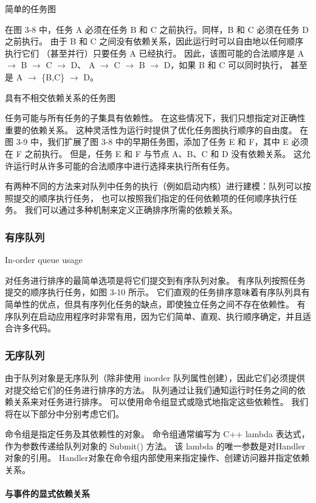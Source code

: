 {\color{red} 简单的任务图 }

在图 3-8 中，任务 A 必须在任务 B 和 C 之前执行。同样，B 和 C 必须在任务 D 之前执行。
由于 B 和 C 之间没有依赖关系，因此运行时可以自由地以任何顺序执行它们 （甚至并行）只要任务 A 已经执行。 
因此，该图可能的合法顺序是 A $\rightarrow$ B $\rightarrow$ C $\rightarrow$ D、
A $\rightarrow$ C $\rightarrow$ B $\rightarrow$ D，如果 B 和 C 可以同时执行，
甚至是 A $\rightarrow$ \{B,C\} $\rightarrow$ D。

{\color{red} 具有不相交依赖关系的任务图}

任务可能与所有任务的子集具有依赖性。 在这些情况下，我们只想指定对正确性重要的依赖关系。 
这种灵活性为运行时提供了优化任务图执行顺序的自由度。 
在图 3-9 中，我们扩展了图 3-8 中的早期任务图，添加了任务 E 和 F，其中 E 必须在 F 之前执行。
但是，任务 E 和 F 与节点 A、B、C 和 D 没有依赖关系。 这允许运行时从许多可能的合法顺序中进行选择来执行所有任务。

有两种不同的方法来对队列中任务的执行（例如启动内核）进行建模：队列可以按照提交的顺序执行任务，
也可以按照我们指定的任何依赖项的任何顺序执行任务。 我们可以通过多种机制来定义正确排序所需的依赖关系。

\subsubsection{有序队列}
{\color{red} In-order queue usage}

对任务进行排序的最简单选项是将它们提交到有序队列对象。 有序队列按照任务提交的顺序执行任务，如图 3-10 所示。 
它们直观的任务排序意味着有序队列具有简单性的优点，但具有序列化任务的缺点，即使独立任务之间不存在依赖性。 
有序队列在启动应用程序时非常有用，因为它们简单、直观、执行顺序确定，并且适合许多代码。

\subsubsection{无序队列}
由于队列对象是无序队列（除非使用 inorder 队列属性创建），因此它们必须提供对提交给它们的任务进行排序的方法。 
队列通过让我们通知运行时任务之间的依赖关系来对任务进行排序。 可以使用命令组显式或隐式地指定这些依赖性。 
我们将在以下部分中分别考虑它们。

命令组是指定任务及其依赖性的对象。 命令组通常编写为 C++ lambda 表达式，作为参数传递给队列对象的 Submit() 方法。 
该 lambda 的唯一参数是对Handler对象的引用。 Handler对象在命令组内部使用来指定操作、创建访问器并指定依赖关系。

\paragraph{与事件的显式依赖关系}

